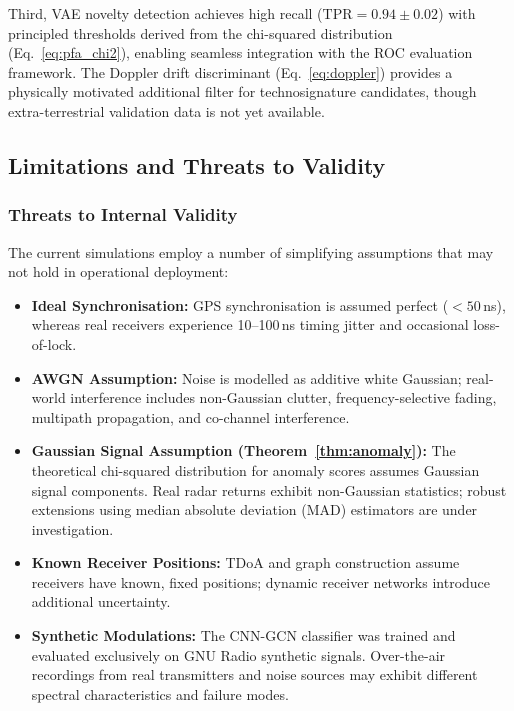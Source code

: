 \documentclass[sensors,article,submit,pdftex]{mdpi}
\begin{document}
Third, VAE novelty detection achieves high recall ($\text{TPR} = 0.94 \pm 0.02$) with principled thresholds derived from the chi-squared distribution (Eq.~\ref{eq:pfa_chi2}), enabling seamless integration with the ROC evaluation framework. The Doppler drift discriminant (Eq.~\ref{eq:doppler}) provides a physically motivated additional filter for technosignature candidates, though extra-terrestrial validation data is not yet available.

\subsection{Limitations and Threats to Validity}
\label{sec:limitations}

\subsubsection{Threats to Internal Validity}
The current simulations employ a number of simplifying assumptions that may not hold in operational deployment:

\begin{itemize}[nosep,leftmargin=*]
    \item \textbf{Ideal Synchronisation:} GPS synchronisation is assumed perfect ($< 50$\,ns), whereas real receivers experience 10--100\,ns timing jitter and occasional loss-of-lock.
    \item \textbf{AWGN Assumption:} Noise is modelled as additive white Gaussian; real-world interference includes non-Gaussian clutter, frequency-selective fading, multipath propagation, and co-channel interference.
    \item \textbf{Gaussian Signal Assumption (Theorem~\ref{thm:anomaly}):} The theoretical chi-squared distribution for anomaly scores assumes Gaussian signal components. Real radar returns exhibit non-Gaussian statistics; robust extensions using median absolute deviation (MAD) estimators are under investigation.
    \item \textbf{Known Receiver Positions:} TDoA and graph construction assume receivers have known, fixed positions; dynamic receiver networks introduce additional uncertainty.
    \item \textbf{Synthetic Modulations:} The CNN-GCN classifier was trained and evaluated exclusively on GNU Radio synthetic signals. Over-the-air recordings from real transmitters and noise sources may exhibit different spectral characteristics and failure modes.
\end{itemize}
\end{document}
